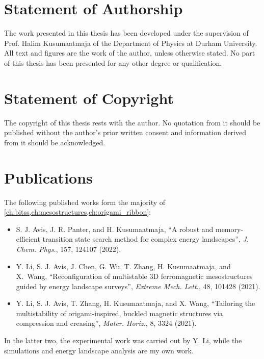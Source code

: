 \chapter*{Statement of Authorship}
\noindent The work presented in this thesis has been developed under the supervision of Prof. Halim Kusumaatmaja of the Department of Physics at Durham University. All text and figures are the work of the author, unless otherwise stated. No part of this thesis has been presented for any other degree or qualification.



{\let\cleardoublepage\relax\let\clearpage\relax \chapter*{Statement of Copyright}}
\noindent The copyright of this thesis rests with the author. No quotation from it should be published without the author's prior written consent and information derived from it should be acknowledged.


\chapter*{Publications}
\newcommand{\theoldfootnote}{\thefootnote}
\renewcommand{\thefootnote}{\fnsymbol{footnote}}
The following published works form the majority of \cref{ch:bitss,ch:mesostructures,ch:origami_ribbon}:
\begin{itemize}
  \item S. J. Avis, J. R. Panter, and H. Kusumaatmaja, ``A robust and memory-efficient transition state search method for complex energy landscapes'', \emph{J. Chem. Phys.}, 157, 124107 (2022).
  \item Y. Li\footnotemark[1], S. J. Avis\footnotemark[1], J. Chen, G. Wu, T. Zhang, H. Kusumaatmaja, and X.~Wang, ``Reconfiguration of multistable 3D ferromagnetic mesostructures guided by energy landscape surveys'', \emph{Extreme Mech. Lett.}, 48, 101428 (2021).
  \item Y. Li\footnotemark[1], S. J. Avis\footnotemark[1], T. Zhang, H. Kusumaatmaja, and X. Wang, ``Tailoring the multistability of origami-inspired, buckled magnetic structures via compression and creasing'', \emph{Mater. Horiz.}, 8, 3324 (2021).
\end{itemize}
In the latter two, the experimental work was carried out by Y. Li, while the simulations and energy landscape analysis are my own work.
\renewcommand{\thefootnote}{\theoldfootnote}


